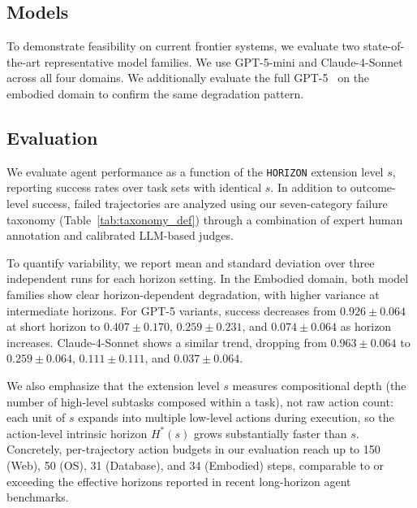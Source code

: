 \documentclass[11pt]{article}
\begin{document}
\subsection{Models} 
To demonstrate feasibility on current frontier systems, we evaluate two state-of-the-art representative model families. 
We use GPT-5-mini \citep{openai-gpt5-mini} and Claude-4-Sonnet \citep{anthropic-claude4-sonnet} across all four domains. We additionally evaluate the full GPT-5~\citep{openai-gpt5} on the embodied domain to confirm the same degradation pattern.

\subsection{Evaluation}
We evaluate agent performance as a function of the \texttt{HORIZON} extension level $s$, reporting success rates over task sets with identical $s$. In addition to outcome-level success, failed trajectories are analyzed using our seven-category failure taxonomy (Table~\ref{tab:taxonomy_def}) through a combination of expert human annotation and calibrated LLM-based judges. 

To quantify variability, we report mean and standard deviation over three independent runs for each horizon setting. In the Embodied domain, both model families show clear horizon-dependent degradation, with higher variance at intermediate horizons. 
For GPT-5 variants, success decreases from \(0.926 \pm 0.064\) at short horizon to \(0.407 \pm 0.170\), \(0.259 \pm 0.231\), and \(0.074 \pm 0.064\) as horizon increases. Claude-4-Sonnet shows a similar trend, dropping from \(0.963 \pm 0.064\) to \(0.259 \pm 0.064\), \(0.111 \pm 0.111\), and \(0.037 \pm 0.064\). 

We also emphasize that the extension level $s$ measures compositional depth (the number of high-level subtasks composed within a task), not raw action count: each unit of $s$ expands into multiple low-level actions during execution, so the action-level intrinsic horizon $H^*(s)$ grows substantially faster than $s$. Concretely, per-trajectory action budgets in our evaluation reach up to 150 (Web), 50 (OS), 31 (Database), and 34 (Embodied) steps, comparable to or exceeding the effective horizons reported in recent long-horizon agent benchmarks.
\end{document}
